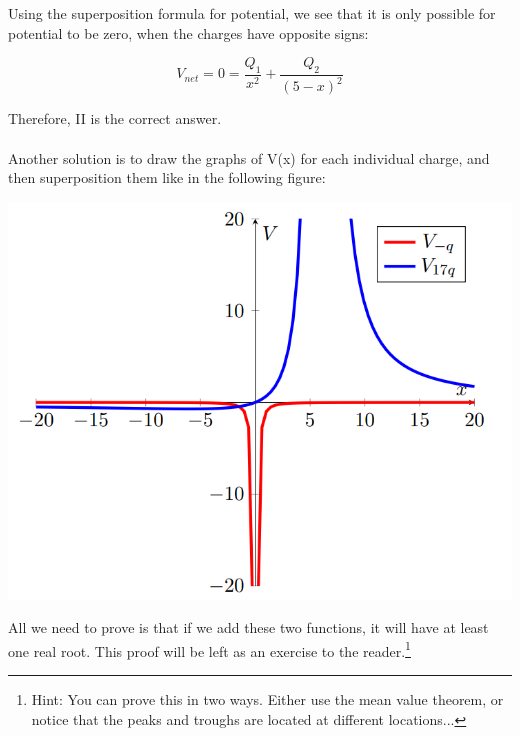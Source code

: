 \begin{solution}
Using the superposition formula for potential, we see that it is only possible for potential to be zero, when the charges have opposite signs:

\begin{equation*}
    V_{net}=0=\frac{Q_1}{x^2}+\frac{Q_2}{(5-x)^2}
\end{equation*}

Therefore, II is the correct answer.
\\\\
Another solution is to draw the graphs of V(x) for each individual charge, and then superposition them like in the following figure:

\begin{center}


\includegraphics{Figures/Figure28}
\end{center}

All we need to prove is that if we add these two functions, it will have at least one real root. This proof will be left as an exercise to the reader.\footnote{Hint: You can prove this in two ways. Either use the mean value theorem, or notice that the peaks and troughs are located at different locations...}

\end{solution}

